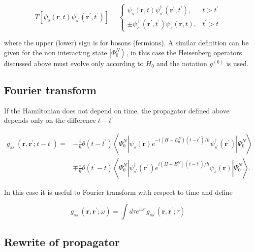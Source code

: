 {$$
T\left[\psi_{s}(\mathbf{r}, t) \psi_{s^{\prime}}^{\dagger}\left(\mathbf{r}^{\prime}, t^{\prime}\right)\right]= \begin{cases}\psi_{s}(\mathbf{r}, t) \psi_{s^{\prime}}^{\dagger}\left(\mathbf{r}^{\prime}, t^{\prime}\right), & t>t^{\prime} \\ \pm \psi_{s^{\prime}}^{\dagger}\left(\mathbf{r}^{\prime}, t^{\prime}\right) \psi_{s}(\mathbf{r}, t), & t^{\prime}>t\end{cases}
$$

where the upper (lower) sign is for bosons (fermions). A similar definition can be given for the non interacting state $\left|\Phi_{0}^{N}\right\rangle$, in this case the Heisenberg operators discussed above must evolve only according to $H_{0}$ and the notation $g^{(0)}$ is used.

\subsection{Fourier transform}

If the Hamiltonian does not depend on time, the propagator defined above
depends only on the difference $t-t^{\prime}$

$$
\begin{aligned}
g_{s s^{\prime}}\left(\mathbf{r}, \mathbf{r}^{\prime} ; t-t^{\prime}\right)= & -\frac{i}{\hbar} \theta\left(t-t^{\prime}\right)\left\langle\Psi_{0}^{N}\left|\psi_{s}(\mathbf{r}) e^{-i\left(H-E_{0}^{N}\right)\left(t-t^{\prime}\right) / \hbar} \psi_{s^{\prime}}^{\dagger}\left(\mathbf{r}^{\prime}\right)\right| \Psi_{0}^{N}\right\rangle \\
& \mp \frac{i}{\hbar} \theta\left(t^{\prime}-t\right)\left\langle\Psi_{0}^{N}\left|\psi_{s^{\prime}}^{\dagger}\left(\mathbf{r}^{\prime}\right) e^{i\left(H-E_{0}^{N}\right)\left(t-t^{\prime}\right) / \hbar} \psi_{s}(\mathbf{r})\right| \Psi_{0}^{N}\right\rangle .
\end{aligned}
$$

In this case it is useful to Fourier transform with respect to time and define

$$
g_{s s^{\prime}}\left(\mathbf{r}, \mathbf{r}^{\prime} ; \omega\right)=\int d \tau e^{i \omega \tau} g_{s s^{\prime}}\left(\mathbf{r}, \mathbf{r}^{\prime} ; \tau\right)
$$


\subsection{Rewrite of propagator}

}
